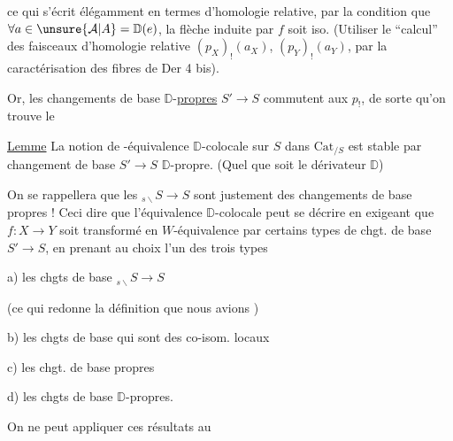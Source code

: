 ce qui s'écrit  élégamment en termes d'homologie relative, par la condition que $\forall a\in\unsure{\mathcal A|A}=\mathbb D(e)$, la flèche induite par $f$
soit iso. (Utiliser le ``calcul'' des faisceaux d'homologie relative $(p_X)_!(a_X)$, $(p_Y)_!(a_Y)$, par la caractérisation des fibres de Der 4 bis).

Or, les changements de base $\mathbb D$-\uline{propres} $S'\longrightarrow S$ commutent aux $p_!$, de sorte qu'on trouve le

\uline{Lemme} La notion de -équivalence $\mathbb D$-colocale sur $S$ dans $\mathrm{Cat}_{/S}$ est stable par  changement de base $S'\longrightarrow S$ $\mathbb D$-propre. (Quel que soit le dérivateur $\mathbb D$)

 On se rappellera que les $ {}_{s\backslash}S\longrightarrow S$ sont justement des changements de base propres ! Ceci  dire que l'équivalence $\mathbb D$-colocale peut se décrire en exigeant que $f:X\longrightarrow Y$ soit transformé en $W$-équivalence par certains types de chgt. de base $S'\longrightarrow S$, en prenant au choix l'un des trois types

a) les chgts de base $ {}_{s\backslash}S\longrightarrow S$

(ce qui redonne la définition que nous avions )

b) les chgts de base qui sont des co-isom. locaux

c) les chgt. de base propres

d) les chgts de base $\mathbb D$-propres.

On ne peut appliquer ces résultats au 
